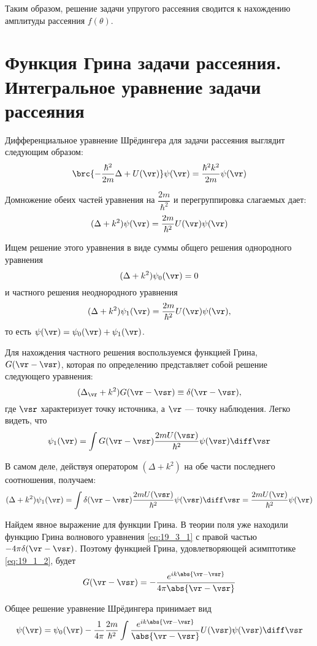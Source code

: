 Таким образом, решение задачи упругого рассеяния сводится к нахождению амплитуды рассеяния $f(\theta)$.

\section{Функция Грина задачи рассеяния. Интегральное уравнение задачи рассеяния}

Дифференциальное уравнение Шрёдингера для задачи рассеяния выглядит следующим образом:
$$
\brc{-\frac{\hbar^2}{2m} \Delta + U(\vr)}\psi(\vr) = \frac{\hbar^2 k^2}{2m} \psi(\vr)
$$

Домножение обеих частей уравнения на $\dfrac{2m}{\hbar^2}$ и перегруппировка слагаемых дает:
$$
(\Delta + k^2) \psi(\vr) = \frac{2m}{\hbar^2}U(\vr)\psi(\vr)
$$

Ищем решение этого уравнения в виде суммы общего решения однородного уравнения
$$
(\Delta + k^2) \psi_0(\vr) = 0
$$
и частного решения неоднородного уравнения
$$
(\Delta + k^2) \psi_1(\vr) = \frac{2m}{\hbar^2}U(\vr)\psi(\vr),
$$
то есть $\psi(\vr)=\psi_0(\vr) + \psi_1(\vr)$.

Для нахождения частного решения воспользуемся функцией Грина\footnotemark{}, ${G(\vr-\vsr)}$, которая по определению представляет собой решение следующего уравнения:
%
\begin{equation}
\label{eq:19_3_1}
(\Delta_{\vr} + k^2)G(\vr - \vsr) \equiv \delta(\vr - \vsr),
\end{equation}
где $\vsr$ характеризует точку источника, а $\vr$ --- точку наблюдения. Легко видеть, что
$$
\psi_1(\vr) = \int G(\vr - \vsr) \frac{2m U(\vsr)}{\hbar^2} \psi(\vsr) \diff\vsr
$$

В самом деле, действуя оператором $(\Delta + k^2)$ на обе части последнего соотношения, получаем:
$$
(\Delta + k^2) \psi_1(\vr) = \int \delta(\vr - \vsr) \frac{2m U(\vsr)}{\hbar^2} \psi(\vsr) \diff\vsr = \frac{2m U(\vr)}{\hbar^2} \psi(\vr)
$$

Найдем явное выражение для функции Грина. В теории поля уже находили функцию Грина волнового уравнения \eqref{eq:19_3_1} с правой частью $-4\pi \delta(\vr - \vsr)$. Поэтому функцией Грина, удовлетворяющей асимптотике \eqref{eq:19_1_2}, будет
$$
G(\vr - \vsr) = - \frac{e^{ik\abs{\vr - \vsr}}}{4\pi\abs{\vr - \vsr}}
$$

Общее решение уравнение Шрёдингера принимает вид
$$
\psi(\vr) = \psi_0(\vr) - \frac{1}{4 \pi}\frac{2m}{\hbar^2}\int \frac{e^{ik\abs{\vr - \vsr}}}{\abs{\vr - \vsr}} U(\vsr)\psi(\vsr)\diff\vsr
$$


